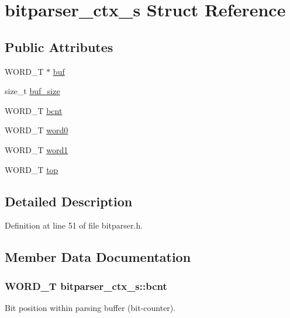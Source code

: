 \hypertarget{structbitparser__ctx__s}{}\section{bitparser\+\_\+ctx\+\_\+s Struct Reference}
\label{structbitparser__ctx__s}
\subsection*{Public Attributes}
\begin{DoxyCompactItemize}
\item 
W\+O\+R\+D\+\_\+T $\ast$ \hyperlink{structbitparser__ctx__s_a61880b79e5e1aaea580c77608246bc04}{buf}
\item 
size\+\_\+t \hyperlink{structbitparser__ctx__s_a994603de6f9d015a3f20766d9e59afa5}{buf\+\_\+size}
\item 
W\+O\+R\+D\+\_\+T \hyperlink{structbitparser__ctx__s_a43a69e23a644cd82a1ed2b416947798a}{bcnt}
\item 
W\+O\+R\+D\+\_\+T \hyperlink{structbitparser__ctx__s_a949e38af43c883fc3dabe70d9085d751}{word0}
\item 
W\+O\+R\+D\+\_\+T \hyperlink{structbitparser__ctx__s_adfd90745c2f12b900e60162c6602c222}{word1}
\item 
W\+O\+R\+D\+\_\+T \hyperlink{structbitparser__ctx__s_a6143b7f13b53e751b33fde7b77486f34}{top}
\end{DoxyCompactItemize}


\subsection{Detailed Description}


Definition at line 51 of file bitparser.\+h.



\subsection{Member Data Documentation}
\subsubsection[{\texorpdfstring{bcnt}{bcnt}}]{\setlength{\rightskip}{0pt plus 5cm}W\+O\+R\+D\+\_\+T bitparser\+\_\+ctx\+\_\+s\+::bcnt}\hypertarget{structbitparser__ctx__s_a43a69e23a644cd82a1ed2b416947798a}{}\label{structbitparser__ctx__s_a43a69e23a644cd82a1ed2b416947798a}
Bit position within parsing buffer (bit-\/counter). 

